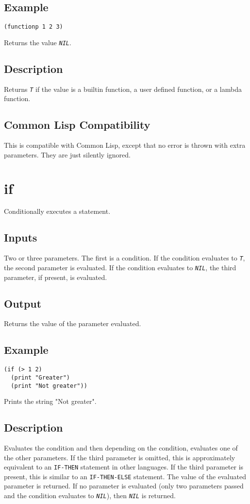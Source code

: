 \documentclass[10pt, openany]{book}
\newcommand{\constant}[1]{\emph{\texttt{#1}}}
\newcommand{\keyword}[1]{\texttt{#1}}
\newcommand{\cl}{Common Lisp}
\begin{document}
\subsection{Example}
\begin{lstlisting}
(functionp 1 2 3)
\end{lstlisting}
Returns the value \constant{NIL}.
\subsection{Description}
Returns \constant{T} if the value is a builtin function, a user defined function, or a lambda function.
\subsection{Common Lisp Compatibility}
This is compatible with \cl, except that no error is thrown with extra parameters.  They are just silently ignored.

\section{if}
Conditionally executes a statement.
\subsection{Inputs}
Two or three parameters.  The first is a condition.  If the condition evaluates to \constant{T}, the second parameter is evaluated.  If the condition evaluates to \constant{NIL}, the third parameter, if present, is evaluated.
\subsection{Output}
Returns the value of the parameter evaluated.
\subsection{Example}
\begin{lstlisting}
(if (> 1 2)
  (print "Greater")
  (print "Not greater"))
\end{lstlisting}
Prints the string "Not greater".
\subsection{Description}
Evaluates the condition and then depending on the condition, evaluates one of the other parameters.  If the third parameter is omitted, this is approximately equivalent to an \keyword{IF-THEN} statement in other languages.  If the third parameter is present, this is similar to an \keyword{IF-THEN-ELSE} statement.  The value of the evaluated parameter is returned.  If no parameter is evaluated (only two parameters passed and the condition evaluates to \constant{NIL}), then \constant{NIL} is returned.
\end{document}
